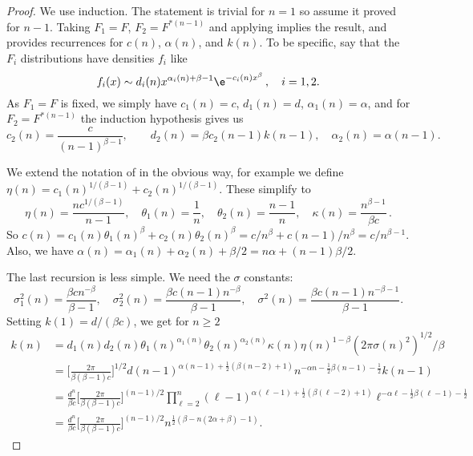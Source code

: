 \begin{proof}
We use induction. The statement is trivial for $n=1$ so assume it proved for $n-1$.
Taking $F_1=F$, $F_2=F^{*(n-1)}$ and applying  implies the result, and provides
recurrences for $c(n)$, $\alpha(n)$, and $k(n)$. To be specific, say that the $F_i$  distributions have densities $f_i$ like
\[ f_i(x) \sim d_i(n) x^{\alpha_i(n)+\beta-1} \e^{-c_i(n) x^\beta} \,, \quad i=1,2. \]
As $F_1=F$ is fixed, we simply have $c_1(n) = c$, $d_1(n) = d$, $\alpha_1(n) = \alpha$, and for $F_2=F^{*(n-1)}$ the induction hypothesis gives us
\[ c_2(n) = \frac{c}{(n-1)^{\beta-1}}, \quad
 \quad d_2(n) = \beta c_2(n-1) k(n-1), \quad \alpha_2(n) = \alpha(n-1) . \]

We extend the notation of  in the obvious way, for example we define $\eta(n)= c_1(n)^{1/(\beta-1)} + c_2(n)^{1/(\beta-1)}$. These simplify to
\[ \eta(n) = \frac{n c^{1/(\beta-1)}}{n-1}, \quad \theta_1(n) = \frac{1}{n}, \quad \theta_2(n) = \frac{n-1}{n}, \quad \kappa(n) = \frac{n^{\beta-1}}{\beta c} \,. \]
So $c(n) = c_1(n) \theta_1(n)^\beta + c_2(n) \theta_2(n)^\beta = c/n^\beta + c (n-1)/n^\beta = c/n^{\beta-1}$. Also, we have
$\alpha(n) = \alpha_1(n) + \alpha_2(n) + \beta/2  = n \alpha + (n-1) \beta / 2$.

The last recursion is less simple. We need the $\sigma$ constants:
\[ \sigma_1^2(n) = \frac{\beta c n^{-\beta}}{\beta-1}, \quad \sigma_2^2(n) = \frac{\beta c (n-1) n^{-\beta}}{\beta-1} ,\quad \sigma^2(n) = \frac{\beta c (n-1) n^{-\beta-1}}{\beta-1} . \]
Setting $k(1) = d/(\beta c)$, we get for $n\ge 2$
\begin{align*}
k(n) &= d_1(n) d_2(n) \theta_1(n)^{\alpha_1(n)} \theta_2(n)^{\alpha_2(n)} \kappa(n) \eta(n)^{1-\beta} (2\pi \sigma(n)^2)^{1/2} / \beta \\
&= \Big[ \frac{2\pi}{\beta(\beta-1) c} \Big]^{1/2} d (n-1)^{\alpha  (n-1)+\frac{1}{2} (\beta  (n-2)+1)} n^{-\alpha n-\frac{1}{2} \beta  (n-1) -\frac{1}{2}} k(n-1) \\
&= \frac{d^n}{\beta c} \Big[ \frac{2\pi}{\beta(\beta-1) c} \Big]^{(n-1)/2} \prod_{\ell=2}^{n} (\ell-1)^{\alpha  (\ell-1)+\frac{1}{2} (\beta  (\ell-2)+1)} \ell^{-\alpha \ell-\frac{1}{2} \beta  (\ell-1) -\frac{1}{2}} \\
&= \frac{d^n}{\beta c} \Big[ \frac{2\pi}{\beta(\beta-1) c} \Big]^{(n-1)/2} n^{\frac{1}{2} (\beta -n (2 \alpha +\beta )-1)}.
\end{align*}

\end{proof}

